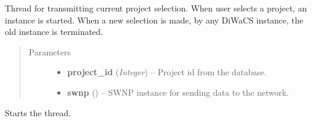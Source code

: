 \documentclass[letterpaper,10pt,english]{sphinxmanual}
\begin{document}
\begin{fulllineitems}
\label{threads:threads.current.CURRENT_PROJECT}
Thread for transmitting current project selection.
When user selects a project, an instance is started.
When a new selection is made, by any DiWaCS instance,
the old instance is terminated.
\begin{quote}\begin{description}
\item[{Parameters}] \leavevmode\begin{itemize}
\item {} 
\textbf{project\_id} (\emph{Integer}) -- Project id from the database.

\item {} 
\textbf{swnp} ({\hyperref[swnp:swnp.SWNP]{}}) -- SWNP instance for sending data to the network.

\end{itemize}

\end{description}\end{quote}

\begin{fulllineitems}
\label{threads:threads.current.CURRENT_PROJECT.run}
Starts the thread.

\end{fulllineitems}


\end{fulllineitems}

\end{document}
